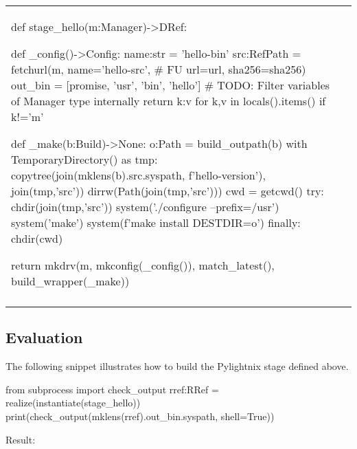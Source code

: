 \documentclass{article}
\begin{document}
\begin{tabular}{|p{}|p{}|}
\begin{pyblock}[stdout][numbers=left]
def stage_hello(m:Manager)->DRef:

  def _config()->Config:
    name:str = 'hello-bin'
    src:RefPath = fetchurl(m, name='hello-src',  # FU \label{fetchurl}
                              url=url,
                              sha256=sha256)
    out_bin = [promise, 'usr', 'bin', 'hello']
    # TODO: Filter variables of Manager type internally
    return {k:v for k,v in locals().items() if k!='m'}

  def _make(b:Build)->None:
    o:Path = build_outpath(b)
    with TemporaryDirectory() as tmp:
      copytree(join(mklens(b).src.syspath, f'hello-{version}'), join(tmp,'src'))
      dirrw(Path(join(tmp,'src')))
      cwd = getcwd()
      try:
        chdir(join(tmp,'src'))
        system('./configure --prefix=/usr')
        system('make')
        system(f'make install DESTDIR={o}')
      finally:
        chdir(cwd)

  return mkdrv(m, mkconfig(_config()),
                  match_latest(),
                  build_wrapper(_make))
\end{pyblock}

\normalsize

\\



&



\\

\hline
\end{tabular}

\subsection{Evaluation}

The following snippet illustrates how to build the Pylightnix stage defined
above.

\begin{pyblock}[stdout]
from subprocess import check_output
rref:RRef = realize(instantiate(stage_hello))
print(check_output(mklens(rref).out_bin.syspath, shell=True))
\end{pyblock}
Result:
\stdoutpythontex
\end{document}
